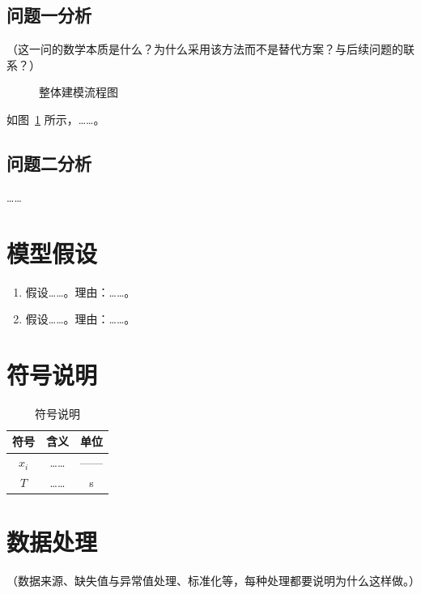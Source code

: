 \documentclass[12pt, a4paper]{ctexart}
\newcommand{\wuhao}{\fontsize{10.5pt}{13pt}\selectfont}  %
\begin{document}
\subsection{问题一分析}
（这一问的数学本质是什么？为什么采用该方法而不是替代方案？与后续问题的联系？）

\begin{figure}[htbp]
  \centering
  \caption{整体建模流程图}
  \label{fig:flow}
\end{figure}

如图~\ref{fig:flow} 所示，……。   %

\subsection{问题二分析}
……

\section{模型假设}
\begin{enumerate}
  \item 假设……。理由：……。
  \item 假设……。理由：……。
\end{enumerate}

\section{符号说明}
\begin{table}[htbp]
  \centering
  \caption{符号说明}
  \label{tab:notation}
  {\songti\wuhao
  \begin{tabular}{ccc}
    \toprule
    符号 & 含义 & 单位 \\
    \midrule
    $x_i$ & …… & —— \\
    $T$   & …… & s \\
    \bottomrule
  \end{tabular}}
\end{table}

\section{数据处理}
（数据来源、缺失值与异常值处理、标准化等，每种处理都要说明为什么这样做。）
\end{document}
